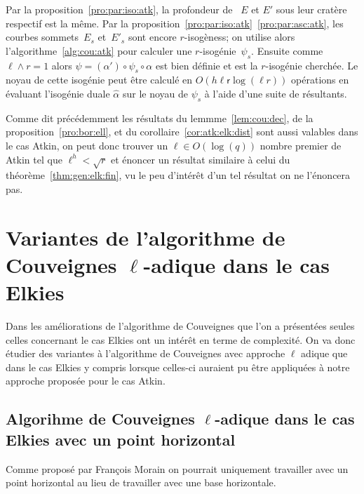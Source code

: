 \documentclass[10pt,a4paper]{book}
\theoremstyle{plain}
\newtheorem{thm}{Théorème}[chapter]
\theoremstyle{definition}
\theoremstyle{definition}
\theoremstyle{definition}
\theoremstyle{definition}
\theoremstyle{remark}
\theoremstyle{remark}
\theoremstyle{definition}
\begin{document}
Par la proposition~\ref{pro:par:iso:atk}, la profondeur de ~$E$ et $E'$ sous
leur cratère respectif est la même.  Par la
proposition~\ref{pro:par:iso:atk}~\ref{pro:par:asc:atk}, les
courbes sommets~$E_{s}$ et~$E'_{s}$ sont encore $r$-isogèness; on utilise
alors l'algorithme~\ref{alg:cou:atk} pour calculer une $r$-isogénie~$\psi_{s}$.  
Ensuite comme $\ell \wedge r =1$ alors $\psi = (\alpha ') \circ \psi_{s} \circ 
\alpha$ est bien définie et est la $r$-isogénie cherchée.
Le noyau de cette isogénie peut être calculé en $O(h\mathsf{\ell r}\log(\ell r))$
opérations en évaluant l'isogénie duale $\widehat{\alpha}$ sur le noyau de 
$\psi_s$ à l'aide d'une suite de résultants. 

Comme dit précédemment les résultats du lemmme~\ref{lem:cou:dec}, de la proposition~\ref{pro:bor:ell},
 et du corollaire~\ref{cor:atk:elk:dist} sont 
aussi valables dans le cas Atkin, on peut donc trouver un $\ell \in O(\log(q))$
nombre premier de Atkin tel que $\ell^h<\sqrt{r}$ et énoncer un résultat 
similaire à celui du théorème~\ref{thm:gen:elk:fin}, vu le peu d'intérêt d'un 
tel résultat on ne l'énoncera pas. 



\chapter{Variantes de l'algorithme de Couveignes $\ell$-adique dans le cas Elkies}
Dans les améliorations de l'algorithme de Couveignes que l'on a présentées 
seules celles concernant le cas Elkies ont un intérêt en terme de complexité. 
On va donc étudier des variantes à l'algorithme de Couveignes avec 
approche $\ell$ adique que dans le cas Elkies y compris lorsque celles-ci
auraient pu être appliquées à notre approche proposée pour le cas Atkin.
\section{Algorihme de Couveignes $\ell$-adique dans le cas Elkies avec un point horizontal}
\label{sec:var:cou:uni}
Comme proposé par François Morain on pourrait uniquement travailler avec un 
point horizontal au lieu de travailler avec une base horizontale.
\end{document}
